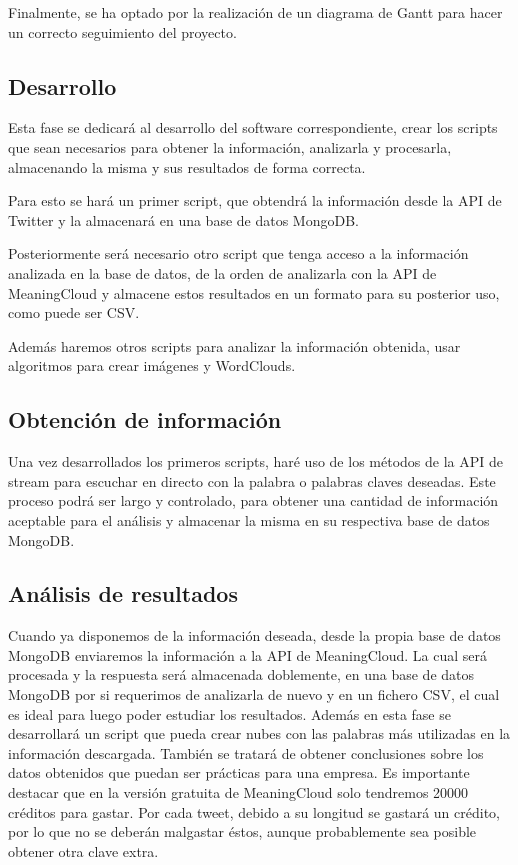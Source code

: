 Finalmente, se ha optado por la realización de un diagrama de Gantt para hacer un correcto seguimiento del proyecto. 

\subsection{Desarrollo}

Esta fase se dedicará al desarrollo del software correspondiente, crear los scripts que sean necesarios para obtener la información, analizarla y procesarla, almacenando la misma y sus resultados de forma correcta.

Para esto se hará un primer script, que obtendrá la información desde la API de Twitter y la almacenará en una base de datos MongoDB. 

Posteriormente será necesario otro script que tenga acceso a la información analizada en la base de datos, de la orden de analizarla con la API de MeaningCloud y almacene estos resultados en un formato para su posterior uso, como puede ser CSV. 

Además haremos otros scripts para analizar la información obtenida, usar algoritmos para crear imágenes y WordClouds.  

\subsection{Obtención de información}

Una vez desarrollados los primeros scripts, haré uso de los métodos de la API de stream para escuchar en directo con la palabra o palabras claves deseadas. Este proceso podrá ser largo y controlado, para obtener una cantidad de información aceptable para el análisis y almacenar la misma en su respectiva base de datos MongoDB. 

\subsection{Análisis de resultados}

Cuando ya disponemos de la información deseada, desde la propia base de datos MongoDB enviaremos la información a la API de MeaningCloud. La cual será procesada y la respuesta será almacenada doblemente, en una base de datos MongoDB por si requerimos de analizarla de nuevo y en un fichero CSV, el cual es ideal para luego poder estudiar los resultados. Además en esta fase se desarrollará un script que pueda crear nubes con las palabras más utilizadas en la información descargada. También se tratará de obtener conclusiones sobre los datos obtenidos que puedan ser prácticas para una empresa. 
Es importante destacar que en la versión gratuita de MeaningCloud solo tendremos 20000 créditos para gastar. Por cada tweet, debido a su longitud se gastará un crédito, por lo que no se deberán malgastar éstos, aunque probablemente sea posible obtener otra clave extra. 




